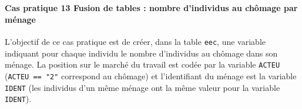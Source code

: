 \documentclass[12pt,]{article}
\let\oldparagraph\paragraph
\renewcommand{\paragraph}[1]{\oldparagraph{#1}\mbox{}}
\begin{document}
~

\paragraph{\texorpdfstring{\textbf{Cas pratique 13} Fusion de tables :
nombre d'individus au chômage par
ménage}{Cas pratique 13 Fusion de tables : nombre d'individus au chômage par ménage}}\label{cas-pratique-13-fusion-de-tables-nombre-dindividus-au-chomage-par-menage}

L'objectif de ce cas pratique est de créer, dans la table \texttt{eec},
une variable indiquant pour chaque individu le nombre d'individus au
chômage dans son ménage. La position sur le marché du travail est codée
par la variable \texttt{ACTEU} (\texttt{ACTEU\ ==\ "2"} correspond au
chômage) et l'identifiant du ménage est la variable \texttt{IDENT} (les
individus d'un même ménage ont la même valeur pour la variable
\texttt{IDENT}).
\end{document}
